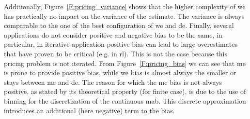 Additionally, Figure~\ref{F:pricing_variance} shows that the higher complexity of \gls{we} has practically no impact on the variance of the estimate.
The variance is always comparable to the one of the best configuration of \gls{we} and \gls{de}.
Finally, several applications do not consider positive and negative bias to be the same, in particular, in iterative application positive bias can lead to large overestimates that have proven to be critical (e.g. in \gls{rl}).
This is not the case because this pricing problem is not iterated. From Figure~\ref{F:pricing_bias} we can see that \gls{me} is prone to provide positive bias, while \gls{we} bias is almost always the smaller or stays between \gls{me} and \gls{de}.
The reason for which the \gls{me} bias is not always positive, as stated by its theoretical property (for finite case), is due 
to the use of binning for the discretization of the continuous \gls{mab}.
This discrete approximation introduces an additional (here negative) term to the bias.

